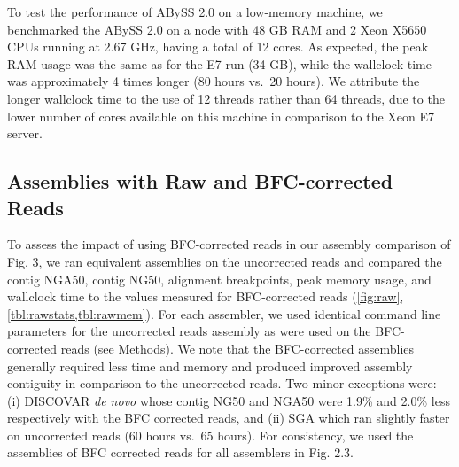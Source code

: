 \documentclass[
  12pt,
  oneside,
  openany]{book}
\begin{document}
\begin{appendices}
To test the performance of ABySS 2.0 on a low-memory machine, we benchmarked the ABySS 2.0 on a node with 48 GB RAM and 2 Xeon X5650 CPUs running at 2.67 GHz, having a total of 12 cores. As expected, the peak RAM usage was the same as for the E7 run (34 GB), while the wallclock time was approximately 4 times longer (80 hours vs.~20 hours). We attribute the longer wallclock time to the use of 12 threads rather than 64 threads, due to the lower number of cores available on this machine in comparison to the Xeon E7 server.

\hypertarget{assemblies-with-raw-and-bfc-corrected-reads}{%
\subsection{Assemblies with Raw and BFC-corrected Reads}\label{assemblies-with-raw-and-bfc-corrected-reads}}

To assess the impact of using BFC-corrected reads in our assembly comparison of Fig. 3, we ran equivalent assemblies on the uncorrected reads and compared the contig NGA50, contig NG50, alignment breakpoints, peak memory usage, and wallclock time to the values measured for BFC-corrected reads (\cref{fig:raw}, \cref{tbl:rawstats,tbl:rawmem}). For each assembler, we used identical command line parameters for the uncorrected reads assembly as were used on the BFC-corrected reads (see Methods). We note that the BFC-corrected assemblies generally required less time and memory and produced improved assembly contiguity in comparison to the uncorrected reads. Two minor exceptions were: (i) DISCOVAR \emph{de novo} whose contig NG50 and NGA50 were 1.9\% and 2.0\% less respectively with the BFC corrected reads, and (ii) SGA which ran slightly faster on uncorrected reads (60 hours vs.~65 hours). For consistency, we used the assemblies of BFC corrected reads for all assemblers in Fig. 2.3.


\end{appendices}
\end{document}

